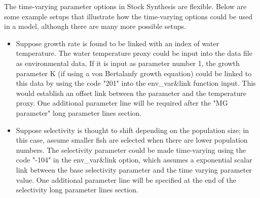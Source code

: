 The time-varying parameter options in Stock Synthesis are flexible. Below are some example setups that illustrate how the time-varying options could be used in a model, although there are many more possible setups.

  \begin{itemize}
    \item Suppose growth rate is found to be linked with an index of water temperature. The water temperature proxy could be input into the data file as environmental data. If it is input as parameter number 1, the growth parameter K (if using a von Bertalanfy growth equation) could be linked to this data by using the code "201" into the env\_var\&link function input. This would establish an offset link between the parameter and the temperature proxy. One additional parameter line will be required after the "MG parameter" long parameter lines section.
    \item Suppose selectivity is thought to shift depending on the population size; in this case, assume smaller fish are selected when there are lower population numbers. The selectivity parameter could be made time-varying using the code "-104" in the env\_var\&link option, which assumes a exponential scalar link between the base selectivity parameter and the time varying parameter value. One additional parameter line will be specified at the end of the selectivity long parameter lines section.
  \end{itemize}
